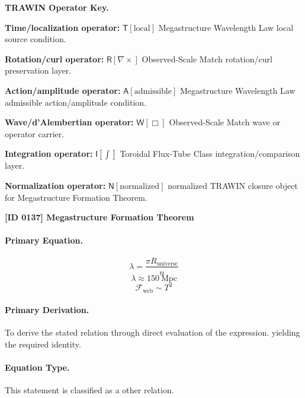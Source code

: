 \par\vspace{0.45\baselineskip}
\noindent\begin{minipage}[t]{\linewidth}
\begingroup
\small
\raggedright
\textbf{TRAWIN Operator Key.}\par
\noindent\textbf{Time/localization operator:} $\mathsf{T}\!\left[\mathrm{local}\right]$ Megastructure Wavelength Law local source condition.\par
\noindent\textbf{Rotation/curl operator:} $\mathsf{R}\!\left[\nabla\times\right]$ Observed-Scale Match rotation/curl preservation layer.\par
\noindent\textbf{Action/amplitude operator:} $\mathsf{A}\!\left[\mathrm{admissible}\right]$ Megastructure Wavelength Law admissible action/amplitude condition.\par
\noindent\textbf{Wave/d'Alembertian operator:} $\mathsf{W}\!\left[\Box\right]$ Observed-Scale Match wave or operator carrier.\par
\noindent\textbf{Integration operator:} $\mathsf{I}\!\left[\int\right]$ Toroidal Flux-Tube Class integration/comparison layer.\par
\noindent\textbf{Normalization operator:} $\mathsf{N}\!\left[\mathrm{normalized}\right]$ normalized TRAWIN closure object for Megastructure Formation Theorem.\par
\endgroup
\end{minipage}

\clearpage
\noindent\textbf{[ID 0137] Megastructure Formation Theorem}\par
\vspace{0.35em}
\paragraph{Primary Equation.}
\[
\lambda=\frac{\pi R_{\mathrm{universe}}}{n}
\]
\[
\lambda \approx 150\ \mathrm{Mpc}
\]
\[
\mathcal{F}_{\mathrm{web}}\sim T^2
\]

\paragraph{Primary Derivation.}
To derive the stated relation through direct evaluation of the expression. yielding the required identity.
\paragraph{Equation Type.}
This statement is classified as a other relation.


